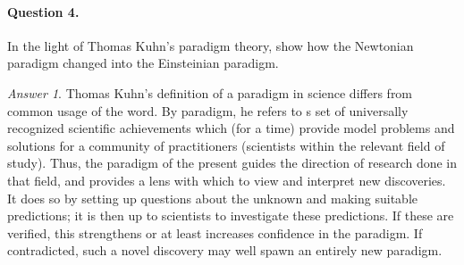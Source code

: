 \documentclass[11pt]{article}
\theoremstyle{remark}
\newtheorem*{answer}{Answer}
\begin{document}
    \paragraph{Question 4.} In the light of Thomas Kuhn's paradigm theory, show how
    the Newtonian paradigm changed into the Einsteinian paradigm.
    \begin{answer}
        Thomas Kuhn's definition of a paradigm in science differs from common usage
        of the word. By paradigm, he refers to s set of universally recognized
        scientific achievements which (for a time) provide model problems and
        solutions for a community of practitioners (scientists within the relevant
        field of study). Thus, the paradigm of the present guides the direction of
        research done in that field, and provides a lens with which to view and
        interpret new discoveries. It does so by setting up questions about the
        unknown and making suitable predictions; it is then up to scientists to
        investigate these predictions. If these are verified, this strengthens or at
        least increases confidence in the paradigm. If contradicted, such a novel
        discovery may well spawn an entirely new paradigm.


\end{answer}
\end{document}
